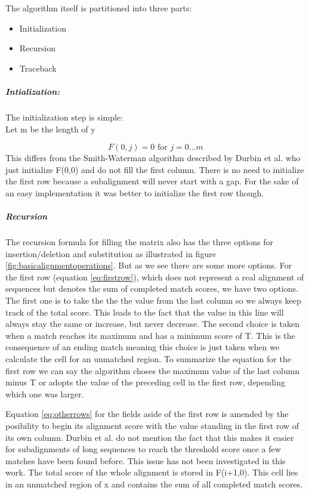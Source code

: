 The algorithm itself is partitioned into three parts: 

\begin{itemize}
	\item Initialization
	\item Recursion
	\item Traceback
\end{itemize}

\subparagraph{Intialization:}
	The initialization step is simple: \\
	Let m be the length of y
	
	\begin{equation*}
		F(0,j) = 0 \text{ for } j=0\dotsc m
	\end{equation*}
	This differs from the Smith-Waterman algorithm described by Durbin et al.\cite{durbin1998} who just initialize F(0,0) and do not fill the first column. There is no need to initialize the first row because a subalignment will never start with a gap. For the sake of an easy implementation it was better to initialize the first row though.

\subparagraph{Recursion}
The recursion formula for filling the matrix also has the three options for insertion/deletion and substitution as illustrated in figure \ref{fig:basicalignmentoperations}.
But as we see there are some more options. 
For the first row (equation \ref{eq:firstrow}), which does not represent a real alignment of sequences but denotes the sum of completed match scores, we have two options. 
The first one is to take the the the value from the last column so we always keep track of the total score. 
This leads to the fact that the value in this line will always stay the same or increase, but never decrease.
The second choice is taken when a match reaches its maximum and has a minimum score of T. 
This is the consequence of an ending match meaning this choice is just taken when we calculate the cell for an unmatched region.
To summarize the equation for the first row we can say the algorithm choses the maximum value of the last column minus T or adopts the value of the preceding cell in the first row, depending which one was larger. 

Equation \ref{eq:otherrows} for the fields aside of the first row is amended by the posibility to begin its alignment score with the value standing in the first row of its own column. 
Durbin et al. do not mention the fact that this makes it easier for subalignments of long sequences to reach the threshold score once a few matches have been found before.
This issue has not been investigated in this work. 
The total score of the whole alignment is stored in F(i+1,0). This cell lies in an unmatched region of x and contains the sum of all completed match scores.


